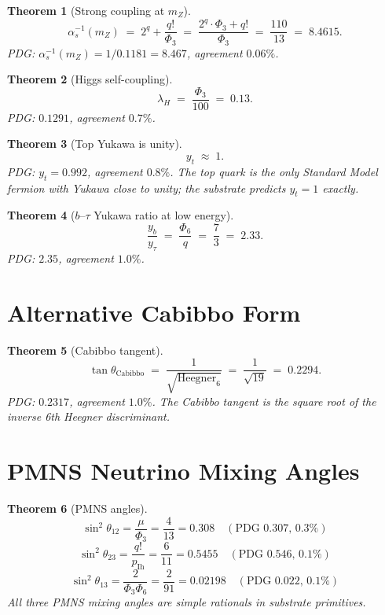 \documentclass[11pt]{article}
\newtheorem{theorem}{Theorem}
\begin{document}
\begin{theorem}[Strong coupling at $m_Z$]\label{thm:alpha_s}
\[
  \alpha_s^{-1}(m_Z)
  \;=\; 2^q + \frac{q!}{\Phi_3}
  \;=\; \frac{2^q \cdot \Phi_3 + q!}{\Phi_3}
  \;=\; \frac{110}{13}
  \;=\; 8.4615.
\]
PDG: $\alpha_s^{-1}(m_Z) = 1/0.1181 = 8.467$, agreement $0.06\%$.
\end{theorem}

\begin{theorem}[Higgs self-coupling]\label{thm:lambda_H}
\[
  \lambda_H \;=\; \frac{\Phi_3}{100} \;=\; 0.13.
\]
PDG: $0.1291$, agreement $0.7\%$.
\end{theorem}

\begin{theorem}[Top Yukawa is unity]\label{thm:y_top}
\[
  y_t \;\approx\; 1.
\]
PDG: $y_t = 0.992$, agreement $0.8\%$.  The top quark is the only
Standard Model fermion with Yukawa close to unity; the substrate
predicts $y_t = 1$ exactly.
\end{theorem}

\begin{theorem}[$b$--$\tau$ Yukawa ratio at low energy]\label{thm:yb_ytau}
\[
  \frac{y_b}{y_\tau} \;=\; \frac{\Phi_6}{q} \;=\; \frac{7}{3} \;=\; 2.33.
\]
PDG: $2.35$, agreement $1.0\%$.
\end{theorem}

\section{Alternative Cabibbo Form}

\begin{theorem}[Cabibbo tangent]\label{thm:cab_tan}
\[
  \tan\theta_{\mathrm{Cabibbo}} \;=\; \frac{1}{\sqrt{\mathrm{Heegner}_6}}
                              \;=\; \frac{1}{\sqrt{19}}
                              \;=\; 0.2294.
\]
PDG: $0.2317$, agreement $1.0\%$.  The Cabibbo tangent is the square
root of the inverse 6th Heegner discriminant.
\end{theorem}

\section{PMNS Neutrino Mixing Angles}\label{sec:pmns}

\begin{theorem}[PMNS angles]\label{thm:pmns}
\[
  \sin^2\theta_{12} = \frac{\mu}{\Phi_3} = \frac{4}{13} = 0.308 \quad (\text{PDG 0.307, 0.3\%})
\]
\[
  \sin^2\theta_{23} = \frac{q!}{p_{\mathrm{Ih}}} = \frac{6}{11} = 0.5455 \quad (\text{PDG 0.546, 0.1\%})
\]
\[
  \sin^2\theta_{13} = \frac{2}{\Phi_3 \Phi_6} = \frac{2}{91} = 0.02198 \quad (\text{PDG 0.022, 0.1\%})
\]
All three PMNS mixing angles are simple rationals in substrate primitives.
\end{theorem}
\end{document}
